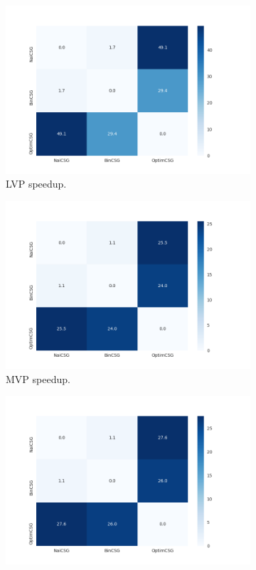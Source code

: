 \documentclass[a4paper,11pt,oneside]{article}
\begin{document}
\begin{figure}[H]
	\centering
	\begin{subfigure}[b]{0.6\textwidth}
		\centering
		\includegraphics[width=\linewidth]{section5/plots/speedup_lvp.png}
		\caption{LVP speedup.}
		\label{sec5:speedup-lvp}
	\end{subfigure}
	\hfill
	\begin{subfigure}[b]{0.6\textwidth}
		\centering
		\includegraphics[width=\linewidth]{section5/plots/speedup_mvp.png}
		\caption{MVP speedup.}
		\label{sec5:speedup-mvp}
	\end{subfigure}
	\medskip
	\begin{subfigure}[b]{0.6\textwidth}
		\centering
		\includegraphics[width=\linewidth]{section5/plots/speedup_hvp.png}

\end{subfigure}
\end{figure}
\end{document}
